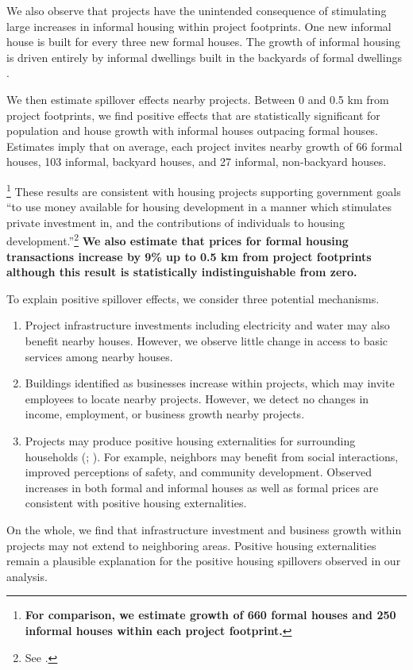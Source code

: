 \documentclass[12pt]{article}
\newcommand{\rv}{}
\newcommand{\rw}{\textbf}
\begin{document}
\rv{We also observe that projects have the unintended consequence of stimulating large increases in informal housing within project footprints. One new informal house is built for every three new formal houses.  The growth of informal housing is driven entirely by informal dwellings built in the backyards of formal dwellings \citep{Brueckner2018backyarding}.

\rv{We then estimate spillover effects nearby projects.}  Between 0 and 0.5 km from project footprints, we find positive effects that are statistically significant for population and house growth with informal houses outpacing formal houses.   Estimates imply that on average, each project invites nearby growth of 66 formal houses, 103 informal, backyard houses, and 27 informal, non-backyard houses.}\footnote{\rw{For comparison, we estimate growth of 660 formal houses and 250 informal houses within each project footprint.}}  These results are consistent with housing projects supporting government goals ``to use money available for housing development in a manner which stimulates private investment in, and the contributions of individuals to housing development.''\footnote{See \cite{housingact}.}  \rw{We also estimate that prices for formal housing transactions increase by 9\% up to 0.5 km from project footprints although this result is statistically indistinguishable from zero.  }


\rv{To explain positive spillover effects, we consider three potential mechanisms.}
\begin{enumerate}
  \item \rv{Project infrastructure investments including electricity and water may also benefit nearby houses.  However, we observe little change in access to basic services among nearby houses.}
  \item \rv{Buildings identified as businesses increase within projects, which may invite employees to locate nearby projects.  However, we detect no changes in income, employment, or business growth nearby projects.}
  \item \rv{Projects may produce positive housing externalities for surrounding households (\cite{rossi2010housing}; \cite{diamond2019wants}).  For example, neighbors may benefit from social interactions, improved perceptions of safety, and community development.  Observed increases in both formal and informal houses as well as formal prices are consistent with positive housing externalities.}
\end{enumerate}
\rv{On the whole, we find that infrastructure investment and business growth within projects may not extend to neighboring areas.  Positive housing externalities remain a plausible explanation for the positive housing spillovers observed in our analysis.}
\end{document}
